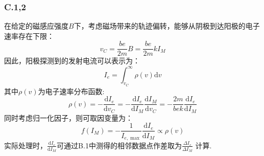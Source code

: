 \documentclass{ctexart}
\begin{document}
\subsubsection*{C.1,2}
\noindent 在给定的磁感应强度$B$下，考虑磁场带来的轨迹偏转，能够从阴极到达阳极的电子速率存在下限：
\begin{equation}
  v_{C}=\frac{be}{2m}B=\frac{be}{2m}kI_M\tag{3}
\end{equation}
\clearpage
\noindent 因此，阳极探测到的发射电流可以表示为：
\begin{equation}
  I_e=\displaystyle \int_{v_C}^{\infty}\rho(v)\mathrm{d}v\tag{4}
\end{equation}
\noindent 其中$\rho(v)$为电子速率分布函数:
\begin{equation}
  \rho(v)=-\frac{\mathrm{d}I_e}{\mathrm{d}v_C}=-\frac{\mathrm{d}I_e}{\mathrm{d}I_M}\frac{\mathrm{d}I_M}{\mathrm{d}v_C}=-\frac{2m}{bek}\frac{\mathrm{d}I_e}{\mathrm{d}I_M}\tag{5}
\end{equation}
同时考虑归一化因子，则可取因变量为：
\begin{equation}
  f(I_M)=-\frac{1}{I_{e,\max}}\frac{\mathrm{d}I_e}{\mathrm{d}I_M}\propto \rho(v) \tag{6}
\end{equation}
实际处理时，$\displaystyle\frac{\mathrm{d}I_e}{\mathrm{d}I_M}$可通过B.1中测得的相邻数据点作差取为$\displaystyle\frac{\Delta I_e}{\Delta I_M}$
计算.\\
\end{document}

